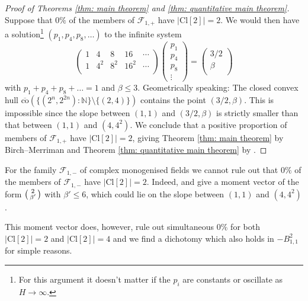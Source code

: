 \documentclass[a4paper, 12pt]{amsart}
\newcommand{\Cl}{\mathrm{Cl}}
\begin{document}
\begin{proof}[Proof of Theorems \ref{thm: main theorem} and \ref{thm: quantitative main theorem}]
Suppose that $0\%$ of the members of $\mathcal{F}_{1,+}$ have $\lvert \Cl[2]\rvert = 2$. We would then have a solution\footnote{For this argument it doesn't matter if the $p_i$ are constants or oscillate as $H \rightarrow \infty$.} $(p_1,p_4,p_8,\ldots)$ to the infinite system
 $$\begin{pmatrix}
    1 &4 &8 &16 &\cdots \\ 
    1 &4^2 &8^2 &16^2 &\cdots \\
\end{pmatrix} \begin{pmatrix}
    p_1\\
    p_4\\
    p_8\\
    \vdots
\end{pmatrix} = \begin{pmatrix}
    3/2\\
    \beta\\
\end{pmatrix}
$$
with $p_1 + p_4 + p_8 + \ldots = 1$ and $\beta \le 3$. Geometrically speaking: The closed convex hull $\overline{\mathrm{co}}(\{(2^n,2^{2n}): \mathbb{N}\} \setminus \{(2,4)\})$ contains the point $(3/2,\beta)$. This is impossible since the slope between $(1,1)$ and $(3/2,\beta)$ is strictly smaller than that between $(1,1)$ and $(4,4^2)$. We conclude that a positive proportion of members of $\mathcal{F}_{1,+}$ have $\lvert \Cl[2] \rvert = 2$, giving Theorem \ref{thm: main theorem} by Birch--Merriman \cite{MR0306119} and Theorem \ref{thm: quantitative main theorem} by \cite{2506.05539}. 
\end{proof}

For the family $\mathcal{F}_{1,-}$ of complex monogenised fields we cannot rule out that $0\%$ of the members of $\mathcal{F}_{1,-}$ have $\lvert \Cl[2] \rvert = 2$. Indeed, \cite{2506.05539} and \cite{BHSpreprint} give a moment vector of the form $ \begin{psmallmatrix} 2\\ \beta' \end{psmallmatrix}$ with $\beta' \le 6$, which could lie on the slope between $(1,1)$ and $(4,4^2)$.

This moment vector does, however, rule out simultaneous $0\%$ for both $\lvert \Cl[2] \lvert = 2$ and $\lvert \Cl[2] \lvert = 4$ and we find a dichotomy which also holds in $-B_{1,1}^2$ for simple reasons.
\end{document}
